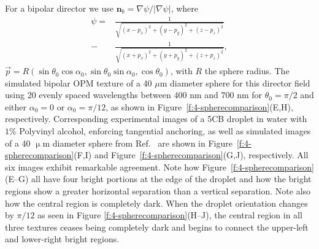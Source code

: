 For a bipolar director we use $\mathbf{n}_b = \nabla \psi/|\nabla \psi|$, where
\begin{align}
\psi =& \frac{1}{\sqrt{(x-p_x)^2+(y-p_y)^2+(z-p_z)^2}} \nonumber \\
      -& \frac{1}{\sqrt{(x+p_x)^2+(y+p_y)^2+(z+p_z)^2}}, \label{e:4-bipolar_pot}
\end{align}
$\vec{p} = R(\sin \theta_0\cos\alpha_0,\sin \theta_0\sin\alpha_0,\cos\theta_0) $, with $R$ the sphere radius.
The simulated bipolar OPM texture of a 40 $\mu$m diameter sphere for this director field using 20 evenly spaced wavelengths between $400$ nm and $700$ nm for $\theta_0 = \pi/2$ and either $\alpha_0 = 0$ or $\alpha_0 = \pi/12$, as shown in Figure~\ref{f:4-spherecomparison}(E,H), respectively.
Corresponding experimental images of a 5CB droplet in water with $1\%$ Polyvinyl alcohol, enforcing tangential anchoring, as well as simulated images of a 40 $\upmu$m diameter sphere from Ref.~ are shown in Figure~\ref{f:4-spherecomparison}(F,I) and Figure~\ref{f:4-spherecomparison}(G,J), respectively.
All six images exhibit remarkable agreement.
Note how Figure~\ref{f:4-spherecomparison}(E--G) all have four bright portions at the edge of the droplet and how the bright regions show a greater horizontal separation than a vertical separation.
Note also how the central region is completely dark.
When the droplet orientation changes by $\pi/12$ as seen in Figure \ref{f:4-spherecomparison}(H--J), the central region in all three textures ceases being completely dark and begins to connect the upper-left and lower-right bright regions.

